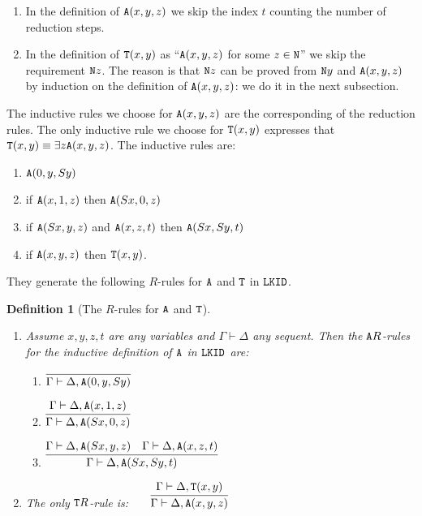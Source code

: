 \documentclass[a4paper,12pt]{article}
\newtheorem{definition}[theorem]{Definition}
\newcommand{\Nat}               { {\tt N}  }
\newcommand{\Tot}           { {\tt T} }
\newcommand{\Ack}   {{\tt A}}
\newcommand{\LKID} { {\tt LKID} }
\begin{document}
\begin{enumerate}
\item 
In the definition of $\Ack(x,y,z)$
we skip the index $t$ counting the number of reduction steps.
\item
In the definition of $\Tot(x,y)$ as ``$\Ack(x,y,z)$ for some $z \in \Nat$''
we skip the requirement $\Nat z$. The reason is that $\Nat z$ can be proved from 
$\Nat y$ and $\Ack(x,y,z)$ by induction on the definition of $\Ack(x,y,z)$: we do it
in the next subsection.
\end{enumerate}

The inductive rules we choose for $\Ack(x,y,z)$ are the corresponding of 
the reduction rules.  The only inductive rule we choose for $\Tot(x,y)$ 
expresses that $\Tot(x,y) \equiv \exists z \Ack(x,y,z)$. The inductive rules are:

\begin{enumerate}
\item
$\Ack(0,y,Sy)$
\item
if $\Ack(x,1,z)$ then $\Ack(Sx,0,z)$
\item
if $\Ack(Sx,y,z)$ and $\Ack(x,z,t)$ then $\Ack(Sx,Sy,t)$
\item
if $\Ack(x,y,z)$ then $\Tot(x,y)$.
\end{enumerate}

They generate the following $R$-rules for $\Ack$ and $\Tot$ in $\LKID$.

\begin{definition}[The $R$-rules for $\Ack$ and $\Tot$]

\begin{enumerate}
\item
Assume $x,y,z,t$ are any variables and $\Gamma \vdash \Delta$ any sequent.
Then the $\Ack R$-rules for the inductive definition of $\Ack$ in $\LKID$ are: 

\begin{enumerate}
\item
$\infer{\Gamma \vdash \Delta, \Ack(0,y,Sy)}{}$
\\

\item
$\infer{\Gamma \vdash \Delta, \Ack(Sx,0,z)}
{\Gamma \vdash \Delta,\Ack(x,1,z)}$
\\

\item 
$\infer{\Gamma \vdash \Delta, \Ack(Sx,Sy,t)}
{\Gamma \vdash \Delta,\Ack(Sx,y,z) \ \ \ \Gamma \vdash \Delta, \Ack(x,z,t)}$
\end{enumerate}

\item
The only $\Tot R$-rule is: \ \ \ 
$\infer{\Gamma \vdash \Delta, \Ack(x,y,z)}{\Gamma \vdash \Delta,\Tot(x,y)}$ 
\end{enumerate}
\end{definition}
\end{document}
